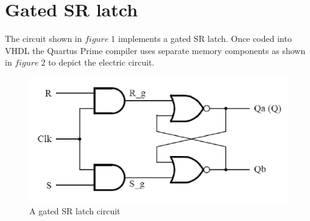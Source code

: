 \documentclass[12pt]{article}
\begin{document}
\newpage

\section{Gated SR latch}

The circuit shown in $figure\;1$ implements a gated SR latch.
Once coded into VHDL the Quartus Prime compiler uses separate memory components as shown in $figure\;2$ to depict the electric circuit.

\begin{figure}[h]
	\centering
    \includegraphics[scale = 0.75]{immagini/SRff.PNG}
    \caption{A gated SR latch circuit}		
\end{figure}
\end{document}
